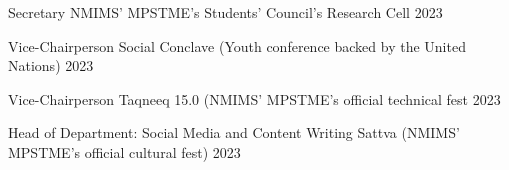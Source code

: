 \vspace{-3mm} 

\begin{cventries}
	
\vspace{1mm} 	
\cventry
	{Secretary} %
	{NMIMS' MPSTME's Students' Council's Research Cell} %
	{2023}%
	{} %
	{}
\vspace{-3.5mm} 

\vspace{1mm}
 \cventry
	{Vice-Chairperson} %
	{Social Conclave (Youth conference backed by the United Nations)} %
	{2023}%
	{} %
	{}
\vspace{-3.5mm} 

\vspace{1mm}
 \cventry
	{Vice-Chairperson} %
	{Taqneeq 15.0 (NMIMS’ MPSTME’s official technical fest} %
	{2023}%
	{} %
	{}
\vspace{-3.5mm} 

\vspace{1mm}
 \cventry
	{Head of Department: Social Media and Content Writing} %
	{Sattva (NMIMS’ MPSTME’s official cultural fest)} %
	{2023}%
	{} %
	{}
\vspace{-3.5mm} 




\vspace{-6.0mm}  

 
\end{cventries}

